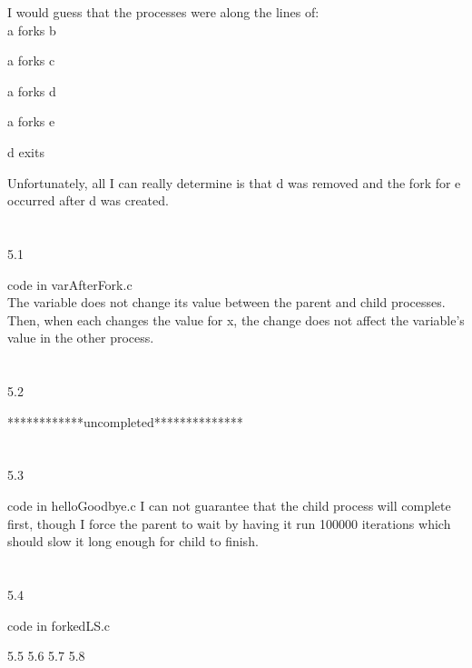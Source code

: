 \documentclass[12pt, a4paper]{article}
\begin{document}
	I would guess that the processes were along the lines of:\\
	
	a forks b
	
	a forks c
	
	a forks d
	
	a forks e
	
	d exits
	
	Unfortunately, all I can really determine is that d was removed and the fork for e occurred after d was created. \\ \\ \\
	
	
5.1

	code in varAfterFork.c\\
	The variable does not change its value between the parent and child processes. Then, when each changes the value for x, the change does not affect the variable's value in the other process. \\ \\ \\
	
5.2

	************uncompleted**************	 \\ \\ \\
	
5.3

	code in helloGoodbye.c
	I can not guarantee that the child process will complete first, though I force the parent to wait by having it run 100000 iterations which should slow it long enough for child to finish. \\ \\ \\

5.4

	code in forkedLS.c

5.5
5.6
5.7
5.8
\end{document}
